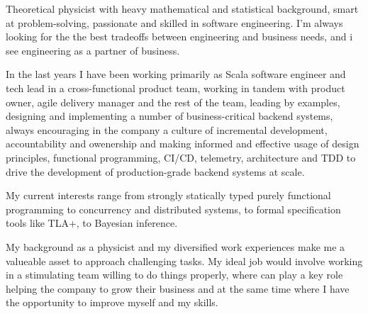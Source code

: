 
\begin{cvparagraph}
Theoretical physicist with heavy mathematical and statistical 
background, smart at problem-solving, passionate and skilled in software engineering. 
I'm always looking for the the best tradeoffs between engineering and business needs, and i see engineering as a partner of business. 

  In the last years I have been working primarily as Scala software engineer and tech lead in a cross-functional product team, working in tandem with product owner, agile delivery manager and the rest of the team, leading by examples, designing and implementing a number of business-critical backend systems, always encouraging in the company a culture of incremental development, accountability and owenership and making informed and effective usage of design principles, functional programming, CI/CD, telemetry, architecture and TDD to drive the development of production-grade backend systems at scale. 

	My current interests range from strongly statically typed purely functional programming to concurrency and distributed systems, to formal specification tools like TLA+, to Bayesian inference. 

My background as a physicist and my diversified work experiences make me a valueable asset to approach challenging tasks. 
My ideal job would involve working in a stimulating team willing to do things properly, where
can play a key role helping the company to grow their business and at the same time
where I have the opportunity to improve myself and my skills.
\end{cvparagraph}

